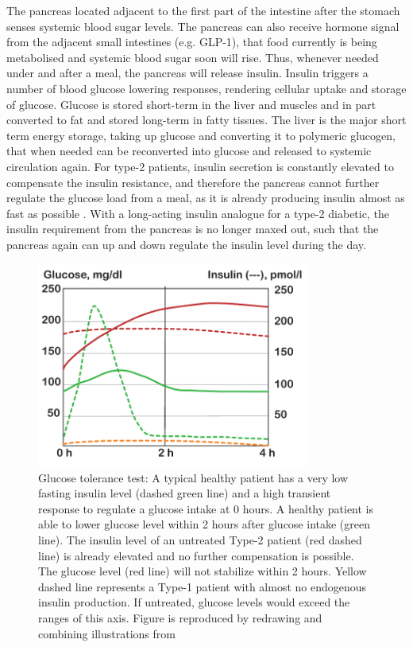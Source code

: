 The pancreas located adjacent to the first part of the intestine after the stomach senses systemic blood sugar levels. The pancreas can also receive hormone signal from the adjacent small intestines (e.g. GLP-1), that food currently is being metabolised and systemic blood sugar soon will rise. Thus, whenever needed under and after a meal, the pancreas will release insulin. Insulin triggers a number of blood glucose lowering responses, rendering cellular uptake and storage of glucose. Glucose is stored short-term in the liver and muscles and in part converted to fat and stored long-term in fatty tissues. The liver is the major short term energy storage, taking up glucose and converting it to polymeric glucogen, that when needed can be reconverted into glucose and released to systemic circulation again. For type-2 patients, insulin secretion is constantly elevated to compensate the insulin resistance, and therefore the pancreas cannot further regulate the glucose load from a meal, as it is already producing insulin almost as fast as possible \cite{silverthorn2010human}. With a long-acting insulin analogue for a type-2 diabetic, the insulin requirement from the pancreas is no longer maxed out, such that the pancreas again can up and down regulate the insulin level during the day.

\begin{figure}[!htpb]
\includegraphics[width=0.8\textwidth,height=0.8\textheight,keepaspectratio]{graphics/glucoseTolerance.pdf}
\caption{Glucose tolerance test: A typical healthy patient has a very low fasting insulin level (dashed green line) and a high transient response to regulate a glucose intake at 0 hours. A healthy patient is able to lower glucose level within 2 hours after glucose intake (green line). The insulin level of an untreated Type-2 patient (red dashed line) is already elevated and no further compensation is possible. The glucose level (red line) will not stabilize within 2 hours. Yellow dashed line represents a Type-1 patient with almost no endogenous insulin production. If untreated, glucose levels would exceed the ranges of this axis. Figure is reproduced by redrawing and combining illustrations from \cite{silverthorn2010human,caumo2004first}}
\label{glucoseTolerance}
\end{figure}

